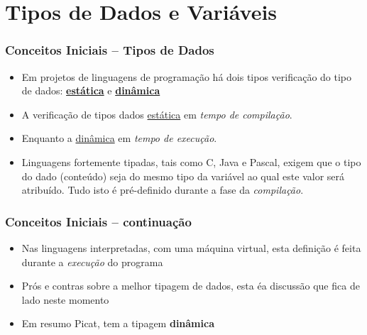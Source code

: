 
\section{Tipos de Dados e Variáveis}

\begin{frame}[fragile]
 \frametitle{Conceitos Iniciais -- Tipos de Dados}


\begin{itemize}

\item Em projetos de linguagens de programação há dois tipos 
verificação do tipo de dados: \underline{\textbf{estática}} e 
 \underline{\textbf{dinâmica}}

  
  \pause 
  \item A verificação de tipos dados   \underline{estática} 
   em \textit{tempo de compilação}.
  
    \pause 
  \item Enquanto a \underline{dinâmica} em \textit{tempo de execução}.
  
  \pause 
  \item Linguagens fortemente tipadas, tais como C, Java e Pascal, 
  exigem que o tipo do dado (conteúdo) seja do mesmo tipo da variável 
  ao qual este valor será atribuído. 
  Tudo isto é pré-definido durante a fase da \textit{compilação}.
  
\end{itemize}
\end{frame}


\begin{frame}[fragile]

 \frametitle{Conceitos Iniciais -- continuação}
\begin{itemize}

  \item Nas linguagens interpretadas, com uma máquina virtual, 
  esta definição é feita durante a \textit{execução} do
  programa
  
  \pause 
  \item Prós e contras sobre a melhor tipagem de dados, esta éa discussão que fica de lado neste momento
  
  \pause 
  \item Em resumo Picat, tem a tipagem \textbf{dinâmica}
  
\end{itemize}
\end{frame}



